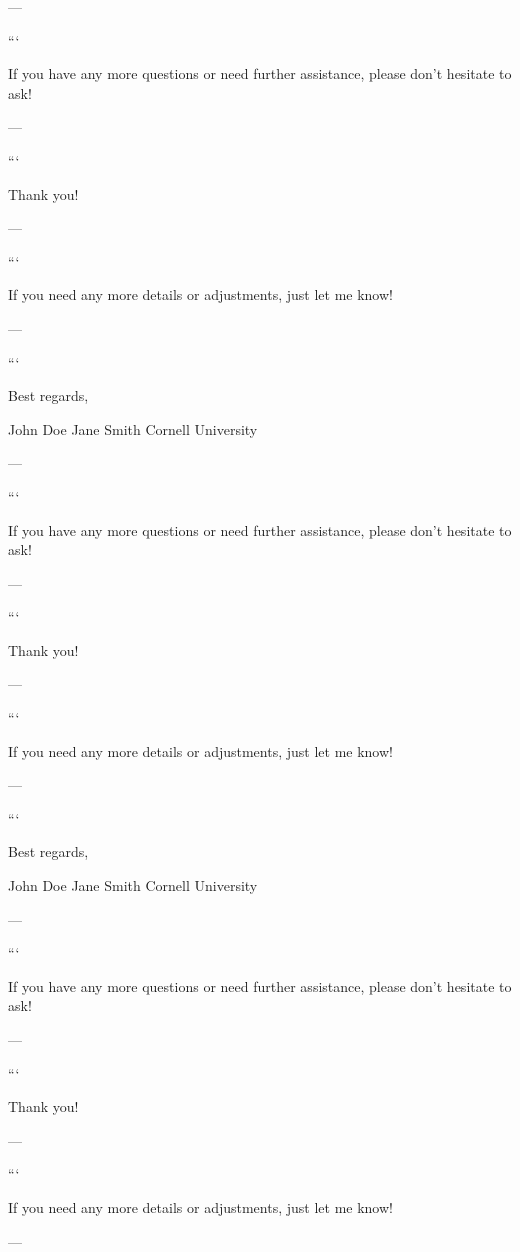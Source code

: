 --- 
 

``` 

If you have any more questions or need further assistance, please don't hesitate to ask! 

--- 
 

``` 

Thank you! 

--- 
 

``` 

If you need any more details or adjustments, just let me know! 

--- 
 

``` 

Best regards, 

John Doe  
Jane Smith  
Cornell University  

--- 
 

``` 

If you have any more questions or need further assistance, please don't hesitate to ask! 

--- 
 

``` 

Thank you! 

--- 
 

``` 

If you need any more details or adjustments, just let me know! 

--- 
 

``` 

Best regards, 

John Doe  
Jane Smith  
Cornell University  

--- 
 

``` 

If you have any more questions or need further assistance, please don't hesitate to ask! 

--- 
 

``` 

Thank you! 

--- 
 

``` 

If you need any more details or adjustments, just let me know! 

--- 
